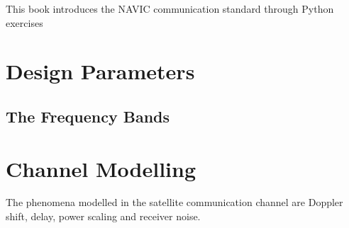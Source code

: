 \documentclass[10pt]{book}
\begin{document}

\setcounter{page}{1}

\begin{introduction}
This book introduces the NAVIC communication standard through Python exercises

\end{introduction}

\mainmatter
\chapter{Design Parameters}
\section{The Frequency Bands}

\chapter{Channel Modelling}
The phenomena modelled in the satellite communication channel are Doppler shift, delay, power scaling and receiver noise.
\end{document}
